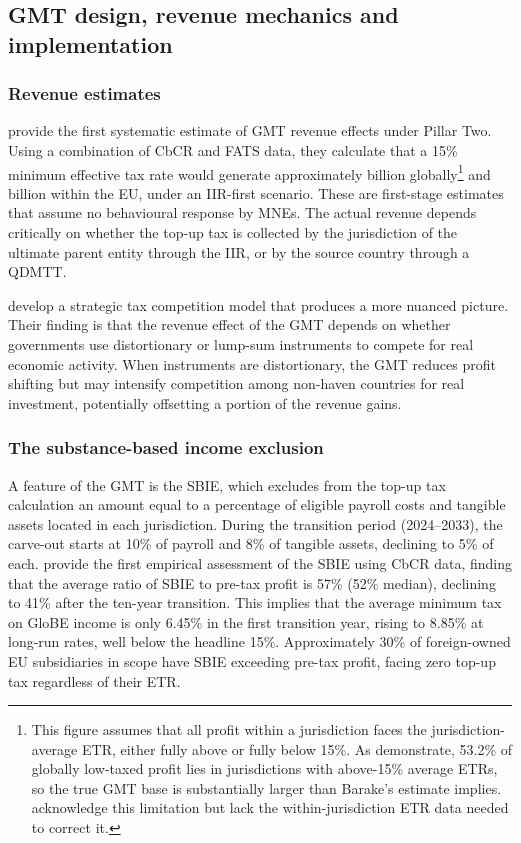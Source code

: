 \documentclass[11pt,a4paper]{article}
\newcommand{\EUR}{\texteuro}
\begin{document}
\subsection{GMT design, revenue mechanics and implementation}\label{sec:design}

\subsubsection{Revenue estimates}

\citet{barake2022} provide the first systematic estimate of GMT revenue effects under Pillar Two. Using a combination of CbCR and FATS data, they calculate that a 15\% minimum effective tax rate would generate approximately \EUR 179 billion globally\footnote{This figure assumes that all profit within a jurisdiction faces the jurisdiction-average ETR, either fully above or fully below 15\%. As \citet{hugger2026} demonstrate, 53.2\% of globally low-taxed profit lies in jurisdictions with above-15\% average ETRs, so the true GMT base is substantially larger than Barake's estimate implies. \citet{barake2022} acknowledge this limitation but lack the within-jurisdiction ETR data needed to correct it.} and \EUR 55 billion within the EU, under an IIR-first scenario. These are first-stage estimates that assume no behavioural response by MNEs. The actual revenue depends critically on whether the top-up tax is collected by the jurisdiction of the ultimate parent entity through the IIR, or by the source country through a QDMTT.

\citet{janeba2023} develop a strategic tax competition model that produces a more nuanced picture. Their finding is that the revenue effect of the GMT depends on whether governments use distortionary or lump-sum instruments to compete for real economic activity. When instruments are distortionary, the GMT reduces profit shifting but may intensify competition among non-haven countries for real investment, potentially offsetting a portion of the revenue gains.

\subsubsection{The substance-based income exclusion}

A feature of the GMT is the SBIE, which excludes from the top-up tax calculation an amount equal to a percentage of eligible payroll costs and tangible assets located in each jurisdiction. During the transition period (2024--2033), the carve-out starts at 10\% of payroll and 8\% of tangible assets, declining to 5\% of each. \citet{devereux2023} provide the first empirical assessment of the SBIE using CbCR data, finding that the average ratio of SBIE to pre-tax profit is 57\% (52\% median), declining to 41\% after the ten-year transition. This implies that the average minimum tax on GloBE income is only 6.45\% in the first transition year, rising to 8.85\% at long-run rates, well below the headline 15\%. Approximately 30\% of foreign-owned EU subsidiaries in scope have SBIE exceeding pre-tax profit, facing zero top-up tax regardless of their ETR.
\end{document}
